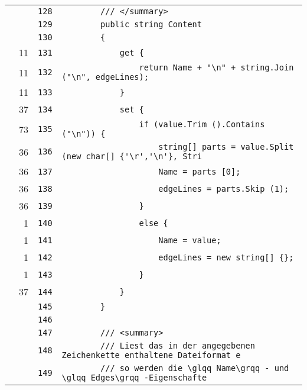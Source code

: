 \documentclass[a4paper,10pt]{article}
\begin{document}
\begin{longtable}[l]{lrrl}
\cellcolor{gray} &  & \verb~128~ & \verb~        /// </summary>~\\
\cellcolor{gray} &  & \verb~129~ & \verb~        public string Content~\\
\cellcolor{gray} &  & \verb~130~ & \verb~        {~\\
\cellcolor{green} & 11 & \verb~131~ & \verb~            get {~\\
\cellcolor{green} & 11 & \verb~132~ & \verb~                return Name + "\n" + string.Join ("\n", edgeLines);~\\
\cellcolor{green} & 11 & \verb~133~ & \verb~            }~\\
\cellcolor{green} & 37 & \verb~134~ & \verb~            set {~\\
\cellcolor{green} & 73 & \verb~135~ & \verb~                if (value.Trim ().Contains ("\n")) {~\\
\cellcolor{green} & 36 & \verb~136~ & \verb~                    string[] parts = value.Split (new char[] {'\r','\n'}, Stri~\\
\cellcolor{green} & 36 & \verb~137~ & \verb~                    Name = parts [0];~\\
\cellcolor{green} & 36 & \verb~138~ & \verb~                    edgeLines = parts.Skip (1);~\\
\cellcolor{green} & 36 & \verb~139~ & \verb~                }~\\
\cellcolor{green} & 1 & \verb~140~ & \verb~                else {~\\
\cellcolor{green} & 1 & \verb~141~ & \verb~                    Name = value;~\\
\cellcolor{green} & 1 & \verb~142~ & \verb~                    edgeLines = new string[] {};~\\
\cellcolor{green} & 1 & \verb~143~ & \verb~                }~\\
\cellcolor{green} & 37 & \verb~144~ & \verb~            }~\\
\cellcolor{gray} &  & \verb~145~ & \verb~        }~\\
\cellcolor{gray} &  & \verb~146~ & \verb~~\\
\cellcolor{gray} &  & \verb~147~ & \verb~        /// <summary>~\\
\cellcolor{gray} &  & \verb~148~ & \verb~        /// Liest das in der angegebenen Zeichenkette enthaltene Dateiformat e~\\
\cellcolor{gray} &  & \verb~149~ & \verb~        /// so werden die \glqq Name\grqq - und \glqq Edges\grqq -Eigenschafte~\\

\end{longtable}
\end{document}

